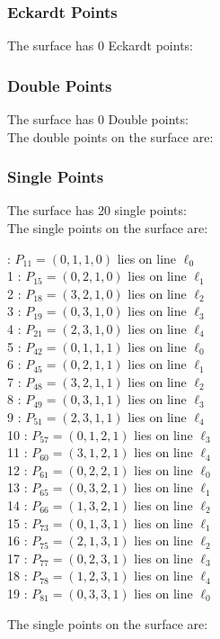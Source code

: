 \documentclass{article}
\begin{document}
{\subsubsection*{Eckardt Points}
The surface has 0 Eckardt points:\\
\subsubsection*{Double Points}
The surface has 0 Double points:\\
The double points on the surface are:\\
\begin{multicols}{2}
\noindent
\end{multicols}
\subsubsection*{Single Points}
The surface has 20 single points:\\
The single points on the surface are:\\
\begin{multicols}{2}
 : $P_{11}=( 0, 1, 1, 0 )$ lies on line $\ell_{0}$\\
1 : $P_{15}=( 0, 2, 1, 0 )$ lies on line $\ell_{1}$\\
2 : $P_{18}=( 3, 2, 1, 0 )$ lies on line $\ell_{2}$\\
3 : $P_{19}=( 0, 3, 1, 0 )$ lies on line $\ell_{3}$\\
4 : $P_{21}=( 2, 3, 1, 0 )$ lies on line $\ell_{4}$\\
5 : $P_{42}=( 0, 1, 1, 1 )$ lies on line $\ell_{0}$\\
6 : $P_{45}=( 0, 2, 1, 1 )$ lies on line $\ell_{1}$\\
7 : $P_{48}=( 3, 2, 1, 1 )$ lies on line $\ell_{2}$\\
8 : $P_{49}=( 0, 3, 1, 1 )$ lies on line $\ell_{3}$\\
9 : $P_{51}=( 2, 3, 1, 1 )$ lies on line $\ell_{4}$\\
10 : $P_{57}=( 0, 1, 2, 1 )$ lies on line $\ell_{3}$\\
11 : $P_{60}=( 3, 1, 2, 1 )$ lies on line $\ell_{4}$\\
12 : $P_{61}=( 0, 2, 2, 1 )$ lies on line $\ell_{0}$\\
13 : $P_{65}=( 0, 3, 2, 1 )$ lies on line $\ell_{1}$\\
14 : $P_{66}=( 1, 3, 2, 1 )$ lies on line $\ell_{2}$\\
15 : $P_{73}=( 0, 1, 3, 1 )$ lies on line $\ell_{1}$\\
16 : $P_{75}=( 2, 1, 3, 1 )$ lies on line $\ell_{2}$\\
17 : $P_{77}=( 0, 2, 3, 1 )$ lies on line $\ell_{3}$\\
18 : $P_{78}=( 1, 2, 3, 1 )$ lies on line $\ell_{4}$\\
19 : $P_{81}=( 0, 3, 3, 1 )$ lies on line $\ell_{0}$\\
\end{multicols}
The single points on the surface are:\\
}
\end{document}
